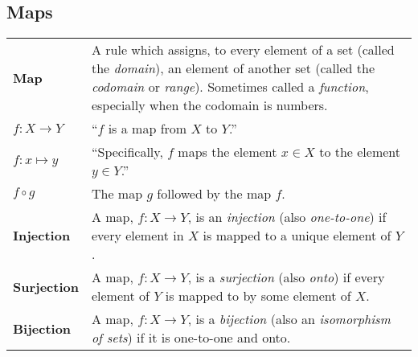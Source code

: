 \documentclass[10pt, a4paper, twocolumn]{article}
\newcommand{\defn}[1]{\textbf{\textsf{#1}}}
\begin{document}
\subsection*{Maps}
\begin{tabularx}{\columnwidth}{@{}p{}>{\raggedright\arraybackslash}X@{}}
  \toprule
  \defn{Map} & A rule which assigns, to every element of a set (called the \emph{domain}), an element of another set (called the \emph{codomain} or \emph{range}). Sometimes called a \emph{function}, especially when the codomain is numbers. \\

  $f:X\to Y$   & ``$f$ is a map from $X$ to $Y$.'' \\

  $f:x \mapsto y$  & ``Specifically, $f$ maps the element $x \in X$ to the
  element $y \in Y$.'' \\
  $f \circ g$    & The map $g$ followed by the map $f$. \\

  \defn{Injection} & A map, $f:X \to Y$, is an \emph{injection} (also \emph{one-to-one}) if every element in $X$ is mapped to a unique element of $Y$. \\

  \defn{Surjection} & A map, $f:X \to Y$, is a \emph{surjection} (also \emph{onto}) if every element of $Y$ is mapped to by some element of $X$. \\

  \defn{Bijection} & A map, $f:X \to Y$, is a \emph{bijection} (also an \emph{isomorphism of sets}) if it is one-to-one and onto. \\ 
  
\end{tabularx}
\end{document}
